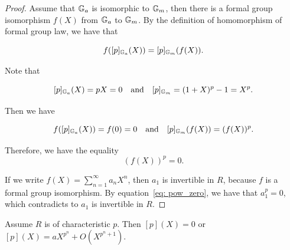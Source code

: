 \begin{proof}
    Assume that $\mathbb{G}_a$ is isomorphic to $\mathbb{G}_m$, then there is a formal group
    isomorphism $f(X)$ from $\mathbb{G}_a$ to $\mathbb{G}_m$.
    By the definition of homomorphism of formal group law, we have that

    \[ f([p]_{\mathbb{G}_a}(X)) = [p]_{\mathbb{G}_m}(f(X)). \]

    Note that

    \[[p]_{\mathbb{G}_a}(X) = pX = 0 \quad \text{and} \quad [p]_{\mathbb{G}_m} = (1+X) ^ p - 1 = X ^ p.\]

    Then we have

    \[f([p]_{\mathbb{G}_a}(X)) = f(0) = 0 \quad \text{and} \quad [p]_{\mathbb{G}_m}(f(X)) = (f(X))^p. \]

    Therefore, we have the equality
    \begin{equation}
        (f(X)) ^ p = 0.
        \label{eq: pow_zero}
    \end{equation}

    If we write
    $f(X) = \sum_{n=1}^{\infty} a_n X ^ n$, then $a_1$ is invertible in $R$, because $f$ is
    a formal group isomorphism. By equation~\eqref{eq: pow_zero}, we have that $a_1 ^ p = 0$, which
    contradicts to $a_1$ is invertible in $R$.

\end{proof}

\begin{proposition}
    Assume $R$ is of characteristic $p$. Then $[p](X) = 0$ or
    $[p](X) = a X ^ {p^n} + O (X ^ {p^n + 1})$.
\end{proposition}

